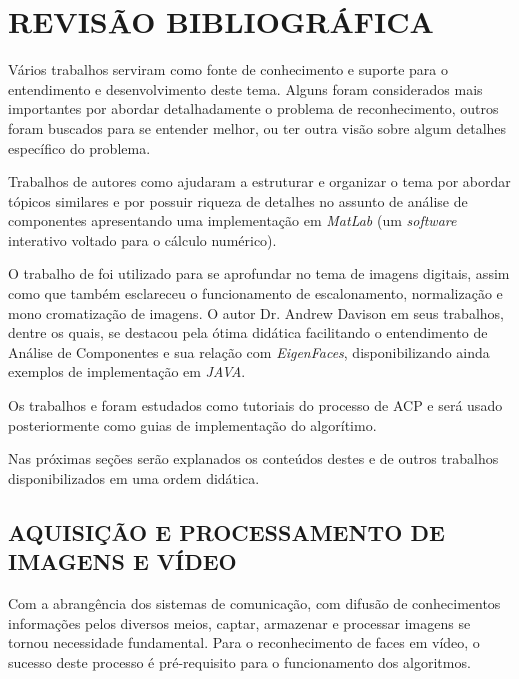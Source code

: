 
\chapter{REVISÃO BIBLIOGRÁFICA}\label{ch:rev-bibs}

Vários trabalhos serviram como fonte de conhecimento e suporte para o entendimento e desenvolvimento deste tema. Alguns foram considerados mais importantes por abordar detalhadamente o problema de reconhecimento, outros foram buscados para se entender melhor, ou ter outra visão sobre algum detalhes específico do problema.

Trabalhos de autores como \cite{geysilva} ajudaram a estruturar e organizar o tema por abordar tópicos similares e por possuir riqueza de detalhes no assunto de análise de componentes apresentando uma implementação em \textit{MatLab} (um \textit{software} interativo voltado para o cálculo numérico).

O trabalho de \cite{img-digital-willians} foi utilizado para se aprofundar no tema de imagens digitais, assim como  \cite{gonzalez_woods} que também esclareceu o funcionamento de escalonamento, normalização e mono cromatização de imagens. O autor Dr. Andrew Davison em seus trabalhos, dentre os quais, \cite{drmathew_java_programming} se destacou pela ótima didática facilitando o entendimento de Análise de Componentes e sua relação com \textit{EigenFaces}, disponibilizando ainda exemplos de implementação em \textit{JAVA}. 

Os trabalhos \cite{tutorial_en_smith} e \cite{tutorial_pt} foram estudados como tutoriais do processo de ACP e será usado posteriormente como guias de implementação do algorítimo.

Nas próximas seções serão explanados os conteúdos destes e de outros trabalhos disponibilizados em uma ordem didática.


\section{AQUISIÇÃO E PROCESSAMENTO DE IMAGENS E VÍDEO}\label{sec:processamento_imagens}

Com a abrangência dos sistemas de comunicação, com difusão de conhecimentos informações pelos diversos meios, captar, armazenar e processar imagens se tornou necessidade fundamental. Para o reconhecimento de faces em vídeo, o sucesso deste processo é pré-requisito  para o funcionamento dos algoritmos. 

